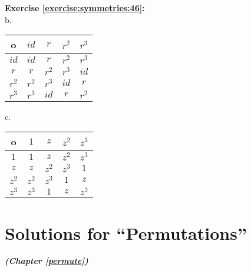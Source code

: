 \hfill\\
\hfill\\
\textbf{Exercise \ref{exercise:symmetries:46}:}\\
b.
\begin{center}
	\begin{tabular}{c| c c c c}
		o & $id$ & $r$ & $r^2$ & $r^3$\\
		\hline
		$id$ & $id$ & $r$ & $r^2$ & $r^3$\\
		$r$ & $r$ & $r^2$ & $r^3$ & $id$\\
		$r^2$ & $r^2$ & $r^3$ & $id$ & $r$\\
		$r^3$ & $r^3$ & $id$ & $r$ & $r^2$
	\end{tabular}
\end{center}
c.
\begin{center}
	\begin{tabular}{c| c c c c}
		o & $1$ & $z$ & $z^2$ & $z^3$\\
		\hline
		$1$ & $1$ & $z$ & $z^2$ & $z^3$\\
		$z$ & $z$ & $z^2$ & $z^3$ & $1$\\
		$z^2$ & $z^2$ & $z^3$ & $1$ & $z$\\
		$z^3$ & $z^3$ & $1$ & $z$ & $z^2$
	\end{tabular}
\end{center}

\section{Solutions for ``Permutations''}
\noindent\textbf{\textit{ (Chapter \ref{permute})}}\bigskip

